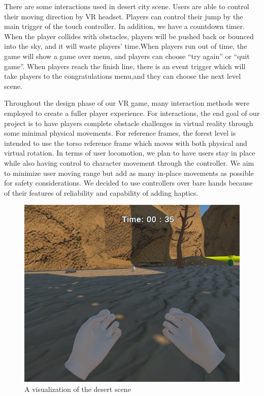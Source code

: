 \documentclass{vgtc}                          %
\begin{document}
There are some interactions used in desert city scene. Users are able to control their moving direction by VR headset. Players can control their jump by the main trigger of the touch controller. In addition, we have a countdown timer. When the player collides with obstacles, players will be pushed back or bounced into the sky, and it will waste players’ time.When players run out of time, the game will show a game  over menu, and players can choose “try again” or “quit game”. When players reach the finish line, there is an event trigger which will take players to the congratulations menu,and they can choose the next level scene. 

Throughout the design phase of our VR game, many interaction methods were employed to create a fuller player experience. For interactions, the end goal of our project is to have players complete obstacle challenges in virtual reality through some minimal physical movements. For reference frames, the forest level is intended to use the torso reference frame which moves with both physical and virtual rotation. In terms of user locomotion, we plan to have users stay in place while also having control to character movement through the controller. We aim to minimize user moving range but add as many in-place movements as possible for safety considerations. We decided to use controllers over bare hands because of their features of reliability and capability of adding haptics.
\begin{figure}[tb]
  \centering %
  \includegraphics[width=\columnwidth]{desert1.jpg}
  \caption{A visualization of the desert scene}
 \end{figure}
\end{document}
